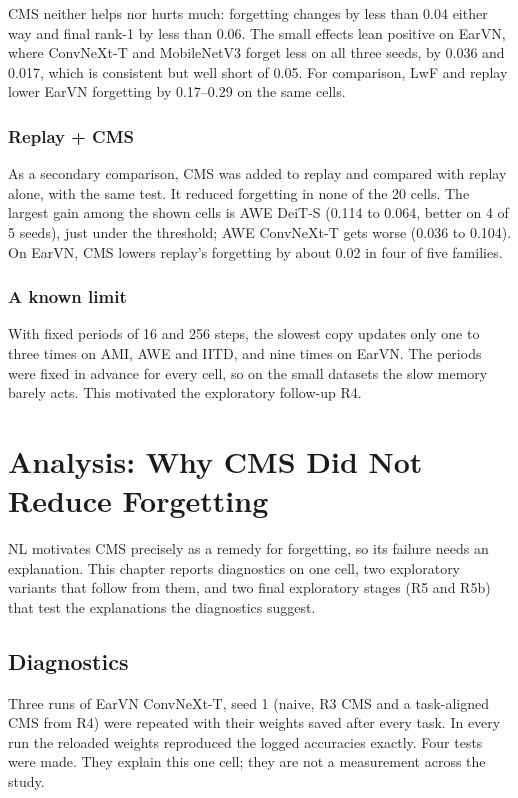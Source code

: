 \documentclass[12pt,a4paper]{report}
\begin{document}
CMS neither helps nor hurts much: forgetting changes by less than 0.04 either way and final rank-1 by less than 0.06. The small effects lean positive on EarVN, where ConvNeXt-T and MobileNetV3 forget less on all three seeds, by 0.036 and 0.017, which is consistent but well short of 0.05. For comparison, LwF and replay lower EarVN forgetting by 0.17--0.29 on the same cells.

\subsection{Replay + CMS}
As a secondary comparison, CMS was added to replay and compared with replay alone, with the same test. It reduced forgetting in none of the 20 cells. The largest gain among the shown cells is AWE DeiT-S (0.114 to 0.064, better on 4 of 5 seeds), just under the threshold; AWE ConvNeXt-T gets worse (0.036 to 0.104). On EarVN, CMS lowers replay's forgetting by about 0.02 in four of five families.

\subsection{A known limit}
With fixed periods of 16 and 256 steps, the slowest copy updates only one to three times on AMI, AWE and IITD, and nine times on EarVN. The periods were fixed in advance for every cell, so on the small datasets the slow memory barely acts. This motivated the exploratory follow-up R4.

\chapter{Analysis: Why CMS Did Not Reduce Forgetting}\label{ch:analysis}

NL motivates CMS precisely as a remedy for forgetting, so its failure needs an explanation. This chapter reports diagnostics on one cell, two exploratory variants that follow from them, and two final exploratory stages (R5 and R5b) that test the explanations the diagnostics suggest.

\section{Diagnostics}
Three runs of EarVN ConvNeXt-T, seed 1 (naive, R3 CMS and a task-aligned CMS from R4) were repeated with their weights saved after every task. In every run the reloaded weights reproduced the logged accuracies exactly. Four tests were made. They explain this one cell; they are not a measurement across the study.
\end{document}
